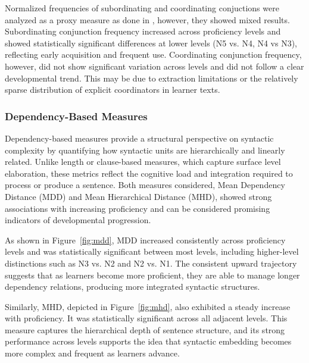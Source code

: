 Normalized frequencies of subordinating and coordinating conjuctions were analyzed as a proxy measure as done in \citet{Vyatkina2012}, however, they showed mixed results. Subordinating conjunction frequency increased across proficiency levels and showed statistically significant differences at lower levels (N5 vs. N4, N4 vs N3), reflecting early acquisition and frequent use. Coordinating conjunction frequency, however, did not show significant variation across levels and did not follow a clear developmental trend. This may be due to extraction limitations or the relatively sparse distribution of explicit coordinators in learner texts.

\subsubsection{Dependency-Based Measures}

Dependency-based measures provide a structural perspective on syntactic complexity by quantifying how syntactic
units are hierarchically and linearly related. Unlike length or clause-based measures, which capture surface level
elaboration, these metrics reflect the cognitive load and integration required to process or produce a sentence.
Both measures considered, Mean Dependency Distance (MDD) and Mean Hierarchical Distance (MHD), showed strong
associations with increasing proficiency and can be considered promising indicators of developmental progression.

As shown in Figure~\ref{fig:mdd}, MDD increased consistently across proficiency levels and was statistically
significant between most levels, including higher-level distinctions such as N3 vs. N2 and N2 vs. N1. The consistent
upward trajectory suggests that as learners become more proficient, they are able to manage longer dependency
relations, producing more integrated syntactic structures.


Similarly, MHD, depicted in Figure~\ref{fig:mhd}, also exhibited a steady increase with proficiency. It was
statistically significant across all adjacent levels. This measure captures the hierarchical depth of sentence
structure, and its strong performance across levels supports the idea that syntactic embedding becomes more complex
and frequent as learners advance.

